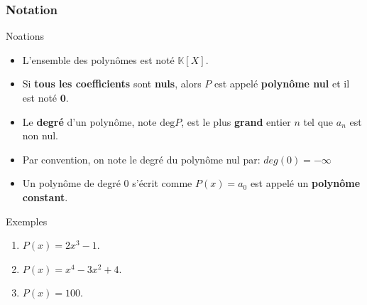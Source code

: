 \documentclass{beamer}
\newcommand{\setK}{\mathbb{K}}
\begin{document}
\begin{frame}[<+->]
  \frametitle{Notation}
 \begin{block}{Noations}
   \begin{itemize}
     \small
     \item L'ensemble des polynômes est noté $\setK[X]$.\\[4pt]
     \item Si \textbf{tous les coefficients} sont \textbf{\alert{nuls}}, alors
       $P$ est appelé \textbf{\alert{polynôme nul}} et il est noté
       $\mathbf{0}$.\\[4pt]
     \item Le \textbf{degré}  d'un polynôme, note $\text{deg} P$, est le plus
       \textbf{grand}  entier $n$ tel que $a_n$ est non nul.\\[4pt]
      \item Par convention, on note le degré du polynôme nul par: $deg(0) =
        -\infty$
      \item Un polynôme de degré $0$ s'écrit comme $P(x)=a_0$ est appelé un
        \textbf{\alert{polynôme constant}}.
   \end{itemize}
 \end{block} 
 \begin{block}{Exemples}
   \small
   \begin{enumerate}
     \item $P(x) = 2x^3 -1$.\\[4pt]    
     \item $P(x) = x^4 - 3x^2 + 4$.\\[4pt]
     \item $P(x) = 100 $.\\[4pt]
   \end{enumerate}
 \end{block}
\end{frame}
\end{document}

